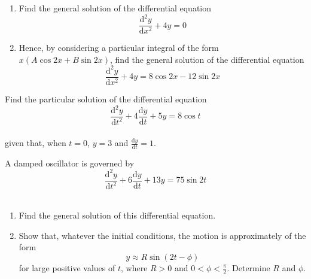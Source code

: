 \documentclass[leqno]{article}
\begin{document}
\djsFrontMatter
\begin{enumerate}[
  label=\textbf{\arabic*.},
  leftmargin=*,
  topsep=0pt,
  partopsep=0pt,
  parsep=0pt
]

\questionitem

\begin{enumerate}[label=\textbf{(\alph*)}]
  \item Find the general solution of the differential equation
  \[
  \frac{\mathrm{d}^2 y}{\mathrm{d}x^2}+4y=0
  \]
  \item Hence, by considering a particular integral of the form $x(A\cos 2x+B\sin 2x)$, find the general solution of the differential equation
  \[
  \frac{\mathrm{d}^2 y}{\mathrm{d}x^2}+4y=8\cos 2x-12\sin 2x
  \]
\end{enumerate}

\newpage

\questionitem

Find the particular solution of the differential equation\\
\[
\frac{\mathrm{d}^2 y}{\mathrm{d}t^2}+4\frac{\mathrm{d}y}{\mathrm{d}t}+5y=8\cos t
\]\\
given that, when $t=0$, $y=3$ and $\frac{\mathrm{d}y}{\mathrm{d}t}=1$.  \\

\newpage

\questionitem

A damped oscillator is governed by \\
\[
\frac{\mathrm{d}^2 y}{\mathrm{d}t^2}+6\frac{\mathrm{d}y}{\mathrm{d}t}+13y=75\sin 2t
\] \\
\begin{enumerate}[label=\textbf{(\alph*)}]
  \item Find the general solution of this differential equation.  \\
  \item Show that, whatever the initial conditions, the motion is approximately of the form
  \[
  y\approx R\sin(2t-\phi)
  \]
  for large positive values of $t$, where $R>0$ and $0<\phi<\frac{\pi}{2}$. Determine $R$ and $\phi$.  \\
\end{enumerate}


\end{enumerate}
\end{document}
